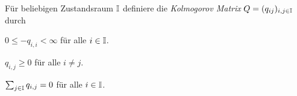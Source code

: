 \documentclass[a4paper]{paper}
\numberwithin{equation}{satz}
\begin{document}
\begin{comment}
\begin{mem}
   Sei $(P(t))_{t\geq0}$ stark stetige Halbgruppe von Markov Operatoren einer zeitlich homogenen Markovkette $(X_t)
   _{t\geq0}$. Ist der Zustandsraum $\I$ endlich, dann gilt:
   \begin{compactenum}
   \item Es existiert $Q=\lim_{h\downarrow 0}\frac{1}{h}\big(P(h)-I\big)$.
   \item $t\mapsto P(t)$ ist differenzierbar und erfüllt für alle $t\geq0$
    $$\frac{\text d P(t)}{\text dt}=P(t)\cdot Q=Q\cdot P(t)\quad\text{ mit $P(0)=I$}.$$
    \end{compactenum}
\end{mem}

\begin{proof}
Da $\I$ endlich ist, ist $\|P\|=\sup_{i\in\I}\sum_{j\in\I}|p_{ij}|$ beschränkt und  die starken Stetigkeit von $t\mapsto P(t)$ impliziert bereits Normstetigkeit, insbesondere ist $P(t)$ integrierbar. Setze $$R(t):=\frac{1}{t}\int_0^t P(s)\text ds, \quad t>0,$$ und es sei $t>0$ so klein, dass für alle $s\in[0,t]$ gilt $$\|P(s)-I\|< 1.$$Dann gilt auch $\|R(t)-I\|< 1$ und es existiert $[R(t)]^{-1}$. Betrachte weiter für $h>0$ 
\begin{align}
\frac{1}{h}[P(h)-I]R(t)
&=\frac{1}{ht}\Bigg[\int_0^t P(h+s)\text ds-\int_0^t P(s)\text ds\Bigg]\\
&=\frac{1}{ht}\Bigg[\int_h^{t+h}P(s)\text ds-\int_0^t P(s)\text ds\Bigg]\\
&=\frac{1}{t}\Bigg[\frac{1}{h}\int_t^{t+h}P(s)\text ds-\frac{1}{h}\int_0^h P(s)\text ds\Bigg].
\end{align}
Damit konvergiert dann die rechte Seite mit $h\downarrow 0$ gegen $\frac{1}{t}(P(t)-I)$, d.h. für $\frac{1}{h}[P(h)-I](R(t))$ existiert ebenfalls der Grenzwert. Durch Multiplikation von $[R(t)]^{-1}$ von rechts setze dann $$\lim_{h\downarrow 0}\frac{1}{h}[P(h)-I]=\frac{\text d P(t)}{\text d t}\Bigg|_{t=0}=:Q.$$
Mit der Halbgruppeneigenschaft von $(P(t))_{t\geq0}$  folgt dann schließlich 
\begin{align}
\lim_{h\downarrow 0}\frac{1}{h}[P(t+h)-P(t)]
&=P(t)\lim_{h\downarrow 0}\frac{1}{h}[P(h)-I]=P(t)Q,\\
\lim_{h\downarrow 0}\frac{1}{-h}P[(t-h)-P(t)]
&=\lim_{h\downarrow 0}P(t-h)\lim_{h\downarrow 0}\frac{1}{h}[P(h)-I]
&=P(t)Q,\end{align} wobei $QP(t)=P(t)Q$ gilt und damit die Ableitung von $t\mapsto P(t)$ existiert und $P(t)Q$ entspricht.
\end{proof}
\end{comment}
\begin{defi}
  Für beliebigen Zustandsraum $\mathbb{I}$ definiere die \textit{Kolmogorov Matrix} $Q=(q_{ij})_{i,j\in\mathbb{I}}$ durch
  \begin{compactenum}
      \item $0\leq -q_{i,i}< \infty$ für alle $i\in\mathbb{I}$.
      \item $q_{i,j}\geq0$ für alle $i\neq j$.
      \item $\sum_{j\in\mathbb{I}}q_{i,j}=0$ für alle $i\in \mathbb{I}$.
  \end{compactenum}
\end{defi}
\end{document}
